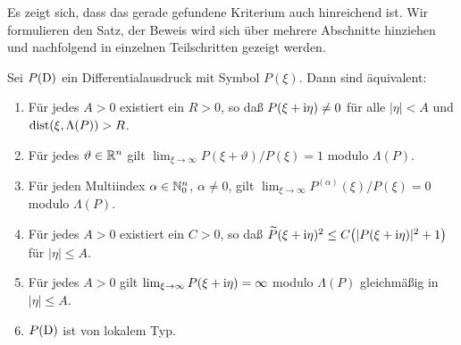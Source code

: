 Es zeigt sich, dass das gerade gefundene Kriterium auch hinreichend ist. Wir formulieren den Satz, der Beweis wird sich über mehrere Abschnitte hinziehen und nachfolgend in einzelnen Teilschritten gezeigt werden.
\begin{thm}\label{thm:3:3.3}
Sei $P(\mathrm D)$ ein Differentialausdruck mit Symbol $P(\xi)$. Dann sind \"aquivalent:
\begin{enumerate}
\item Für jedes $A>0$ existiert ein $R>0$, so daß $P(\xi+\mathrm i\eta)\ne0$ für alle $|\eta|<A$ und $\operatorname{dist}(\xi,\Lambda(P))>R$.
\item Für jedes $\vartheta\in\mathbb R^n$ gilt $\lim_{\xi\to\infty} P(\xi+\vartheta)/P(\xi)=1$ modulo $\Lambda(P)$.
\item Für jeden Multiindex $\alpha\in\mathbb N_0^n$, $\alpha\ne0$, gilt $\lim_{\xi\to\infty} P^{(\alpha)}(\xi)/P(\xi)=0$ modulo $\Lambda(P)$.
\item Für jedes $A>0$ existiert ein $C>0$, so daß $\widetilde P(\xi+\mathrm i\eta)^2\le C\big(|P(\xi+\mathrm i\eta)|^2+1\big)$ für $|\eta|\le A$.
\item Für jedes $A>0$ gilt $\lim_{\xi\to\infty} P(\xi+\mathrm i\eta)=\infty$ modulo $\Lambda(P)$ gleichmäßig in $|\eta|\le A$.
\item $P(\mathrm D)$ ist von lokalem Typ.
\end{enumerate}
\end{thm} 





